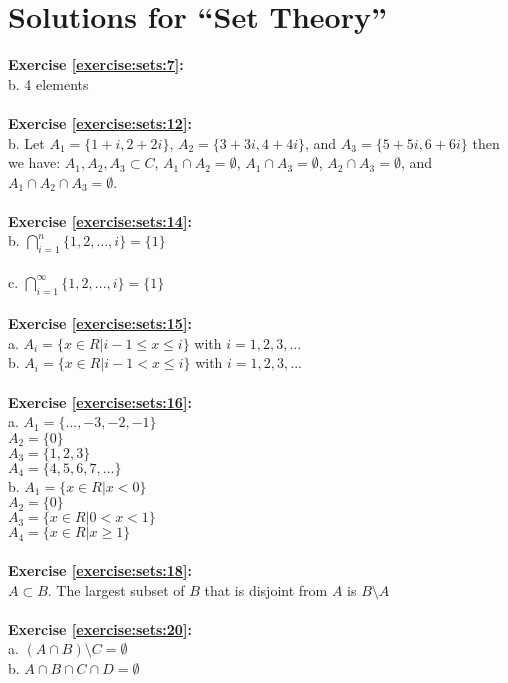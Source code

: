 \section{Solutions for ``Set Theory''}
\noindent{}\bigskip

\textbf{Exercise \ref{exercise:sets:7}:}\\
b. 4 elements\\
\\
\textbf{Exercise \ref{exercise:sets:12}:}\\
b. Let $A_1=\{ 1+i,2+2i\}$, $A_2=\{ 3+3i,4+4i\}$, and $A_3=\{5+5i,6+6i\}$ then we have:
$A_1,A_2,A_3 \subset C$, $A_1 \cap A_2=\emptyset$, $A_1 \cap A_3=\emptyset$, $A_2 \cap A_3=\emptyset$, and $A_1 \cap A_2 \cap A_3=\emptyset$.\\
\\
\textbf{Exercise \ref{exercise:sets:14}:}\\
b. $\bigcap^{n}_{i=1} \{ 1,2,...,i \}=\{1\}$\\
\\
c. $\bigcap^{\infty}_{i=1} \{ 1,2,...,i \}=\{1\}$\\
\\
\textbf{Exercise \ref{exercise:sets:15}:}\\
a. $A_i=\{x\in R|i-1 \le x\le i\}$ with $i=1,2,3,...$\\
b. $A_i=\{x\in R|i-1 < x\le i\}$ with $i=1,2,3,...$\\
\\
\textbf{Exercise \ref{exercise:sets:16}:}\\
a. $A_1=\{...,-3,-2,-1\} $\\
$A_2=\{0\}$\\
$A_3=\{1,2,3\}$\\
$A_4=\{4,5,6,7,...\}$\\
b. $A_1=\{x\in R|x<0\}$\\
$A_2=\{0\}$\\
$A_3=\{x\in R|0<x<1\}$\\
$A_4=\{x\in R|x\ge 1\}$\\
\\
\textbf{Exercise \ref{exercise:sets:18}:}\\
$A\subset B$. The largest subset of $B$ that is disjoint from $A$ is $B\setminus A$\\
\\
\textbf{Exercise \ref{exercise:sets:20}:}\\
a. $(A\cap B)\setminus C=\emptyset$\\
b. $A\cap B\cap C\cap D=\emptyset$\\
